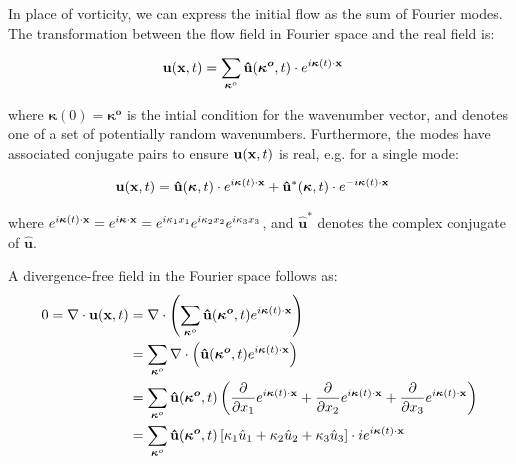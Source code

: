 \documentclass[paper=a4, fontsize=11pt]{scrartcl} %
\numberwithin{equation}{section} %
\numberwithin{figure}{section} %
\numberwithin{table}{section} %
\begin{document}
In place of vorticity, we can express the initial flow as the sum of Fourier modes. 
The transformation between the flow field in Fourier space and the real field is:

\begin{align}
    \bold{u}( \bold{x},t) &= \sum_{ \bm{\kappa}^o}  \bold{\hat{u}}(\bm{\kappa^o}, t) \cdot e^{i \bm{\kappa}(t) \cdot \bold{x}}
\end{align}

where $\bm{\kappa}(0) = \bm{\kappa^o} $ is the intial condition for the wavenumber vector, and denotes one of a set of potentially random wavenumbers.
Furthermore, the modes have associated conjugate pairs to ensure $\bold{u}(\bold{x},t)$ is real, e.g. for a single mode:

\begin{align}
    \bold{u}(\bold{x},t) &= \bold{\hat{u}}(\bm{\kappa}, t) \cdot  e^{i \bm{\kappa}(t) \cdot \bold{x}} + \bold{\hat{u}^*}(\bm{\kappa}, t) \cdot  e^{-i \bm{\kappa}(t) \cdot \bold{x}}
\end{align}


where
$
    e^{i \bm{\kappa}(t) \cdot \bold{x}} = e^{i \bm{\kappa} \cdot \bold{x}} = e^{i \kappa_1 x_1} e^{i \kappa_2 x_2} e^{i \kappa_3 x_3}
$, 
and $\bm{\hat{u}}^*$ denotes the complex conjugate of $\bm{\hat{u}}$.

A divergence-free field in the Fourier space follows as:
\begin{align}
    0 = \nabla \cdot \bold{u}( \bold{x},t) &= \nabla \cdot \left ( \sum_{ \bm{\kappa}^o}  \bold{\hat{u}}(\bm{\kappa^o}, t) e^{i \bm{\kappa}(t) \cdot \bold{x}} \right ) \\
    &= \sum_{ \bm{\kappa}^o}  \nabla \cdot \left ( \bold{\hat{u}}(\bm{\kappa^o}, t)  e^{i \bm{\kappa}(t) \cdot \bold{x}} \right )  \\
    &= \sum_{ \bm{\kappa}^o} \bold{\hat{u}}(\bm{\kappa^o}, t) \left (
        \frac{\partial}{\partial x_1} e^{i \bm{\kappa}(t) \cdot \bold{x}} + 
        \frac{\partial}{\partial x_2} e^{i \bm{\kappa}(t) \cdot \bold{x}} + 
        \frac{\partial}{\partial x_3} e^{i \bm{\kappa}(t) \cdot \bold{x}}
        \right ) \\
    &= \sum_{ \bm{\kappa}^o} \bold{\hat{u}}(\bm{\kappa^o}, t) 
        \left [ \kappa_1 \hat{u}_1 + \kappa_2 \hat{u}_2 + \kappa_3 \hat{u}_3
        \right ] 
        \cdot i e^{i \bm{\kappa}(t) \cdot \bold{x}}
\end{align}
\end{document}

